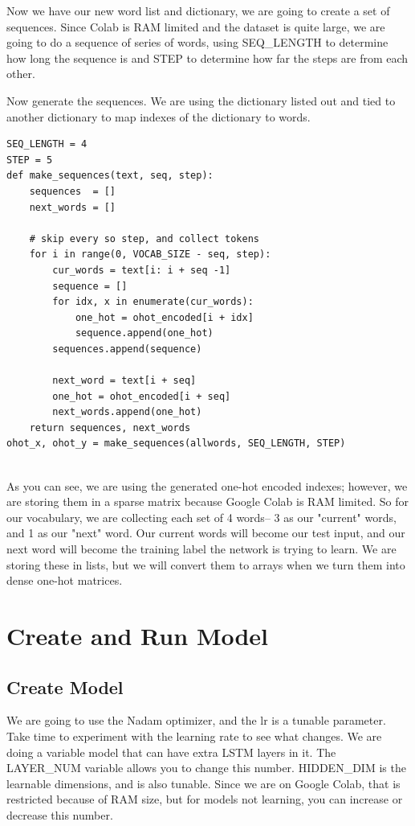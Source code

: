 \documentclass{article}
\begin{document}
 Now we have our new word list and dictionary, we are going to create a set of sequences. Since Colab is RAM limited and the dataset is quite large, we are going to do a sequence of series of words, using SEQ\_LENGTH to determine how long the sequence is and STEP to determine how far the steps are from each other. 
  
  Now generate the sequences. We are using the dictionary listed out and tied to another dictionary to map indexes of the dictionary to words.  
  
  \begin{verbatim}
SEQ_LENGTH = 4
STEP = 5
def make_sequences(text, seq, step):
    sequences  = []
    next_words = []

    # skip every so step, and collect tokens 
    for i in range(0, VOCAB_SIZE - seq, step):
        cur_words = text[i: i + seq -1]
        sequence = []
        for idx, x in enumerate(cur_words):
            one_hot = ohot_encoded[i + idx]
            sequence.append(one_hot)
        sequences.append(sequence)

        next_word = text[i + seq]
        one_hot = ohot_encoded[i + seq]
        next_words.append(one_hot)
    return sequences, next_words
ohot_x, ohot_y = make_sequences(allwords, SEQ_LENGTH, STEP)
      
  \end{verbatim}
  
As you can see, we are using the generated one-hot encoded indexes; however, we are storing them in a sparse matrix because Google Colab is RAM limited. So for our vocabulary, we are collecting each set of 4 words-- 3 as our "current" words, and 1 as our "next" word. Our current words will become our test input, and our next word will become the training label the network is trying to learn. We are storing these in lists, but we will convert them to arrays when we turn them into dense one-hot matrices. 

\section{Create and Run Model}

\subsection{Create Model}
We are going to use the Nadam optimizer, and the lr is a tunable parameter. Take time to experiment with the learning rate to see what changes. We are doing a variable model that can have extra LSTM layers in it. The LAYER\_NUM variable allows you to change this number. HIDDEN\_DIM is the learnable dimensions, and is also tunable. Since we are on Google Colab, that is restricted because of RAM size, but for models not learning, you can increase or decrease this number.
\end{document}
